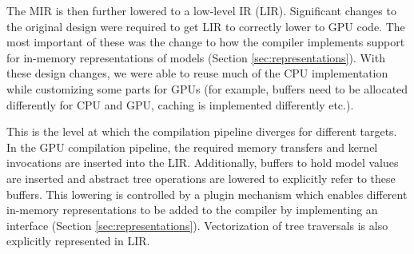 The MIR is then further lowered to a low-level IR (LIR). 
Significant changes to the original \TreebeardOLD{} design were required to get
LIR to correctly lower to GPU code. The most important of these was 
the change to how the compiler implements support for in-memory 
representations of models (Section \ref{sec:representations}).
With these design changes, we were able to reuse much of the CPU 
implementation while customizing some parts for GPUs (for example,
buffers need to be allocated differently for CPU and GPU, caching 
is implemented differently etc.). 

This is the
level at which the compilation pipeline diverges for different targets. In 
the GPU compilation pipeline, the required memory transfers and kernel
invocations are inserted into the LIR. Additionally, buffers 
to hold model values are inserted and abstract tree operations are lowered to
explicitly refer to these buffers. This lowering is controlled by 
a plugin mechanism which enables different in-memory representations to 
be added to the compiler by implementing an interface 
(Section \ref{sec:representations}). Vectorization of tree traversals
is also explicitly represented in LIR.



